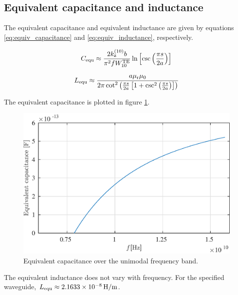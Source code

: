 \subsection{Equivalent capacitance and inductance}

The equivalent capacitance and equivalent inductance are given by equations \ref{eq:equiv_capacitance} and \ref{eq:equiv_inductance}, respectively.

\begin{equation}
C_{\rm equ} \approx \frac{2 k_{\rm z}^{\rm (10)} b}{\pi^2 f W_{\rm 10}^{\rm TE}} \ln \left[ \csc \left( \frac{\pi s}{2a} \right) \right]
\label{eq:equiv_capacitance}
\end{equation}

\begin{equation}
L_{\rm equ} \approx \frac{a \mu_{\rm r} \mu_{\rm 0}}{2 \pi \cot^2 \left( \frac{\pi s}{2a} \left[ 1 + \csc^2 \left( \frac{\pi s}{2a}\right) \right] \right)}
\label{eq:equiv_inductance}
\end{equation}

The equivalent capacitance is plotted in figure \ref{fig:equiv_capa}.

\begin{figure}[h t b p]
	\centering
	\includegraphics[width=\textwidth,keepaspectratio]{figures/equiv_capacitance.eps}
	\caption{Equivalent capacitance over the unimodal frequency band.}
	\label{fig:equiv_capa}
\end{figure}

The equivalent inductance does not vary with frequency.
For the specified waveguide, $L_{\rm equ} \approx \SI{2.1633e-8}{\henry\slash\meter}$.